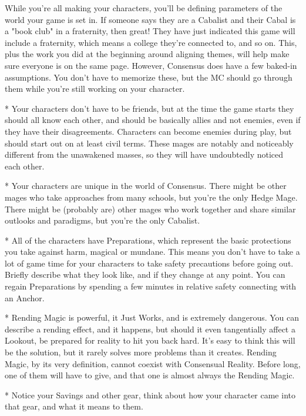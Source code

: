 \documentclass[
  oneside,
  statementpaper,
  9pt]{memoir}
\begin{document}
\begin{Player}

While you're all making your characters, you'll be defining parameters of the world your game is set in. If someone says they are a Cabalist and their Cabal is a "book club" in a fraternity, then great! They have just indicated this game will include a fraternity, which means a college they're connected to, and so on. This, plus the work you did at the beginning around aligning themes, will help make sure everyone is on the same page. However, Consensus does have a few baked-in assumptions. You don't have to memorize these, but the MC should go through them while you're still working on your character.

* Your characters don’t have to be friends, but at the time the game starts they should all know each other, and should be basically allies and not enemies, even if they have their disagreements. Characters can become enemies during play, but should start out on at least civil terms. These mages are notably and noticeably different from the unawakened masses, so they will have undoubtedly noticed each other.

* Your characters are unique in the world of Consensus. There might be other mages who take approaches from many schools, but you’re the only Hedge Mage. There might be (probably are) other mages who work together and share similar outlooks and paradigms, but you’re the only Cabalist.

* All of the characters have Preparations, which represent the basic protections you take against harm, magical or mundane. This means you don’t have to take a lot of game time for your characters to take safety precautions before going out. Briefly describe what they look like, and if they change at any point. You can regain Preparations by spending a few minutes in relative safety connecting with an Anchor.

* Rending Magic is powerful, it Just Works, and is extremely dangerous. You can describe a rending effect, and it happens, but should it even tangentially affect a Lookout, be prepared for reality to hit you back hard. It’s easy to think this will be the solution, but it rarely solves more problems than it creates. Rending Magic, by its very definition, cannot coexist with Consensual Reality. Before long, one of them will have to give, and that one is almost always the Rending Magic.

* Notice your Savings and other gear, think about how your character came into that gear, and what it means to them.


\end{Player}
\end{document}
